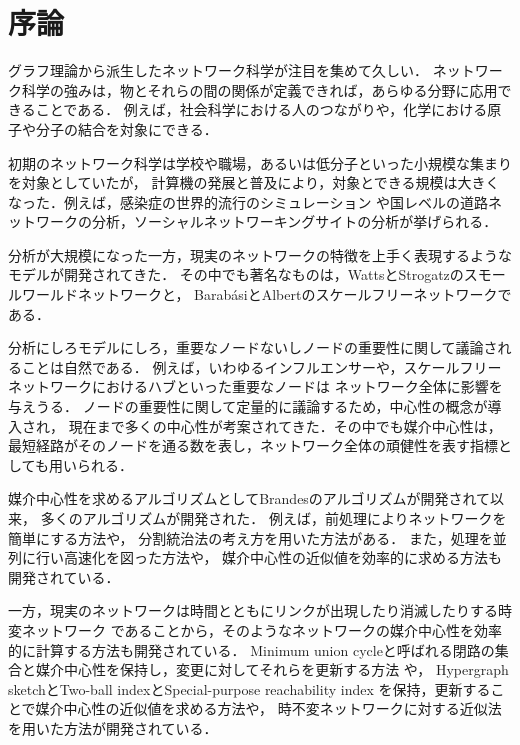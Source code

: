 \chapter{序論}
\label{chap:introduction}

グラフ理論から派生したネットワーク科学が注目を集めて久しい．
ネットワーク科学の強みは，物とそれらの間の関係が定義できれば，あらゆる分野に応用できることである．
例えば，社会科学における人のつながりや，化学における原子や分子の結合を対象にできる．

初期のネットワーク科学は学校や職場，あるいは低分子といった小規模な集まりを対象としていたが，
計算機の発展と普及により，対象とできる規模は大きくなった．例えば，感染症の世界的流行のシミュレーション
や国レベルの道路ネットワークの分析，ソーシャルネットワーキングサイトの分析が挙げられる．

分析が大規模になった一方，現実のネットワークの特徴を上手く表現するようなモデルが開発されてきた．
その中でも著名なものは，WattsとStrogatzのスモールワールドネットワーク\cite{Watts1998}と，
Barab{\'{a}}siとAlbertのスケールフリーネットワーク\cite{Barabasi1999}である．

分析にしろモデルにしろ，重要なノードないしノードの重要性に関して議論されることは自然である．
例えば，いわゆるインフルエンサーや，スケールフリーネットワークにおけるハブといった重要なノードは
ネットワーク全体に影響を与えうる．
ノードの重要性に関して定量的に議論するため，中心性の概念が導入され，
現在まで多くの中心性が考案されてきた．その中でも媒介中心性\cite{Freeman1977}は，
最短経路がそのノードを通る数を表し，ネットワーク全体の頑健性を表す指標としても用いられる．

媒介中心性を求めるアルゴリズムとしてBrandesのアルゴリズム\cite{Brandes2001}が開発されて以来，
多くのアルゴリズムが開発された．
例えば，前処理によりネットワークを簡単にする方法\cite{Puzis2012,Bentert2018}や，
分割統治法\cite{Erdos2015}の考え方を用いた方法がある．
また，処理を並列に行い高速化を図った方法\cite{Bader2006,Tan2009,Edmonds2010,Bernaschi2016}や，
媒介中心性の近似値を効率的に求める方法\cite{Brandes2007,Bader2007,Pfeffer2012,Yoshida2014}も
開発されている．

一方，現実のネットワークは時間とともにリンクが出現したり消滅したりする時変ネットワーク\cite{Holme2012}
であることから，そのようなネットワークの媒介中心性を効率的に計算する方法も開発されている．
Minimum union cycleと呼ばれる閉路の集合と媒介中心性を保持し，変更に対してそれらを更新する方法
\cite{Lee2012,Singh2015}や，
Hypergraph sketch\cite{Yoshida2014}とTwo-ball indexとSpecial-purpose reachability index
を保持，更新することで媒介中心性の近似値を求める方法\cite{Hayashi2015}や，
時不変ネットワークに対する近似法を用いた方法\cite{Bergamini2015a,Bergamini2015b}が開発されている．

